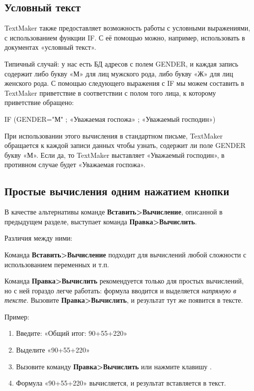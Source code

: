 ﻿\documentclass[a4paper,10pt]{article}
\begin{document}
\subsection{Условный текст}
TextMaker также предоставляет возможность работы с условными выражениями, с использованием функции IF. С её помощью можно, например, использовать в документах «условный текст». 

Типичный случай: у нас есть БД адресов с полем GENDER, и каждая запись содержит либо букву «М» для лиц мужского рода, либо букву «Ж» для лиц женского рода. С помощью следующего выражения с IF мы можем составить в TextMaker приветствие в соответствии с полом того лица, к которому приветствие обращено:

IF (GENDER="М" ; «Уважаемая госпожа» ; «Уважаемый господин»)

При использовании этого вычисления в стандартном письме, TextMaker обращается к каждой записи данных чтобы узнать, содержит ли поле GENDER букву «М». Если да, то TextMaker выставляет «Уважаемый господин», в противном случае будет «Уважаемая госпожа».

\subsection{Простые вычисления одним нажатием кнопки}
В качестве альтернативы команде \textbf{Вставить>Вычисление}, описанной в предыдущем разделе, выступает команда \textbf{Правка>Вычислить}.

Различия между ними:

Команда \textbf{Вставить>Вычисление} подходит для вычислений любой сложности с использованием переменных и т.п.

Команда \textbf{Правка>Вычислить} рекомендуется только для простых вычислений, но с ней гораздо легче работать: формула вводится и выделяется \textit{напрямую в тексте}. Вызовите \textbf{Правка>Вычислить}, и результат тут же появится в тексте.

Пример:

\begin{enumerate}
 \item Введите: «Общий итог: 90+55+220»
 \item Выделите «90+55+220»
 \item Вызовите команду \textbf{Правка>Вычислить} или нажмите клавишу .
 \item Формула «90+55+220» вычисляется, и результат вставляется в текст.
\end{enumerate}
\end{document}
